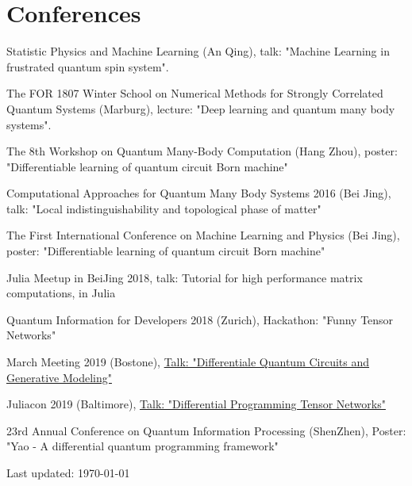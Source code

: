 \documentclass[letterpaper]{article}
\def\footerlink{}   %
\renewenvironment{itemize}{
  \begin{list}{}{
    \setlength{\leftmargin}{1.5em}
  }
}{
  \end{list}
}
\begin{document}
\section*{Conferences}
\begin{itemize}
    \item [1] Statistic Physics and Machine Learning (An Qing), talk: "Machine Learning in frustrated quantum spin system".
    \item [2] The FOR 1807 Winter School on Numerical Methods for Strongly Correlated Quantum Systems (Marburg), lecture: "Deep learning and quantum many body systems".
    \item [3] The 8th Workshop on Quantum Many-Body Computation (Hang Zhou), poster: "Differentiable learning of quantum circuit Born machine"
    \item [4] Computational Approaches for Quantum Many Body Systems 2016 (Bei Jing), talk: "Local indistinguishability and topological phase of matter"
    \item [5] The First International Conference on Machine Learning and Physics (Bei Jing), poster: "Differentiable learning of quantum circuit Born machine"
    \item [6] Julia Meetup in BeiJing 2018, talk: Tutorial for high performance matrix computations, in Julia
    \item [7] Quantum Information for Developers 2018 (Zurich), Hackathon: "Funny Tensor Networks"
    \item [8] March Meeting 2019 (Bostone), \href{https://meetings.aps.org/Meeting/MAR19/Session/E27.10}{Talk: "Differentiale Quantum Circuits and Generative Modeling"}
    \item [9] Juliacon 2019 (Baltimore), \href{https://www.youtube.com/watch?v=f-CaQMTqjPk}{Talk: "Differential Programming Tensor Networks"}
    \item [10] 23rd Annual Conference on Quantum Information Processing (ShenZhen), Poster: "Yao - A differential quantum programming framework"
\end{itemize}

\bigskip

\begin{center}
  \begin{footnotesize}
    Last updated: \today \\
    \href{\footerlink}{\texttt{\footerlink}}
  \end{footnotesize}
\end{center}
\end{document}
